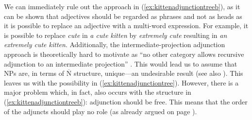 \begin{exe}
\ex
\begin{multicols}{2}
\begin{xlist}
\ex \label{ex:kittenadjunctiontree}

\ex \label{ex:kittenadjunctiontreeb}


\end{xlist}
\end{multicols}
\end{exe}





\noindent We can immediately rule out the approach in (\ref{ex:kittenadjunctiontreeb}), as it can be shown that adjectives should be regarded as phrases and not as heads as it is possible to replace an adjective with a multi-word expression. For example, it is possible to replace \textit{cute} in \textit{a cute kitten} by \textit{extremely cute} resulting in \textit{an extremely cute kitten}. Additionally, the intermediate-projection adjunction approach is theoretically hard to motivate as ``no other category allows recursive adjunction to an intermediate projection'' \citep[94]{scott2002stacked}. This would lead us to assume that NPs are, in terms of $\overline{\textrm{N}}$ structure, unique---an undesirable result (see also \citealt{abney1987english}). This leaves us with the possibility in (\ref{ex:kittenadjunctiontree}). However, there is a major problem which, in fact, also occurs with the structure in (\ref{ex:kittenadjunctiontreeb}): adjunction should be free. This means that the order of the adjuncts should play no role (as already argued on page \pageref{generaladjunction}).

